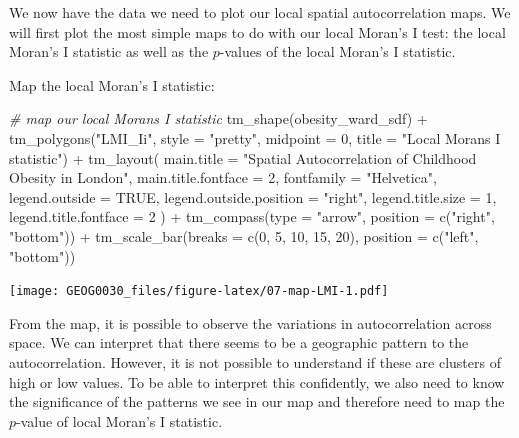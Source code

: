 \documentclass[
]{book}
\newenvironment{Shaded}{\begin{snugshade}}{\end{snugshade}}
\newcommand{\AttributeTok}[1]{\textcolor[rgb]{0.77,0.63,0.00}{#1}}
\newcommand{\CommentTok}[1]{\textcolor[rgb]{0.56,0.35,0.01}{\textit{#1}}}
\newcommand{\ConstantTok}[1]{\textcolor[rgb]{0.00,0.00,0.00}{#1}}
\newcommand{\DecValTok}[1]{\textcolor[rgb]{0.00,0.00,0.81}{#1}}
\newcommand{\FunctionTok}[1]{\textcolor[rgb]{0.00,0.00,0.00}{#1}}
\newcommand{\NormalTok}[1]{#1}
\newcommand{\SpecialCharTok}[1]{\textcolor[rgb]{0.00,0.00,0.00}{#1}}
\newcommand{\StringTok}[1]{\textcolor[rgb]{0.31,0.60,0.02}{#1}}
\begin{document}
We now have the data we need to plot our local spatial autocorrelation maps. We will first plot the most simple maps to do with our local Moran's I test: the local Moran's I statistic as well as the \(p\)-values of the local Moran's I statistic.

Map the local Moran's I statistic:

\begin{Shaded}
\begin{Highlighting}[]
\CommentTok{\# map our local Moran\textquotesingle{}s I statistic}
\FunctionTok{tm\_shape}\NormalTok{(obesity\_ward\_sdf) }\SpecialCharTok{+}
  \FunctionTok{tm\_polygons}\NormalTok{(}\StringTok{"LMI\_Ii"}\NormalTok{, }\AttributeTok{style =} \StringTok{"pretty"}\NormalTok{, }\AttributeTok{midpoint =} \DecValTok{0}\NormalTok{, }\AttributeTok{title =} \StringTok{"Local Moran\textquotesingle{}s I statistic"}\NormalTok{) }\SpecialCharTok{+}
  \FunctionTok{tm\_layout}\NormalTok{(}
    \AttributeTok{main.title =} \StringTok{"Spatial Autocorrelation of Childhood Obesity in London"}\NormalTok{,}
    \AttributeTok{main.title.fontface =} \DecValTok{2}\NormalTok{, }\AttributeTok{fontfamily =} \StringTok{"Helvetica"}\NormalTok{,}
    \AttributeTok{legend.outside =} \ConstantTok{TRUE}\NormalTok{,}
    \AttributeTok{legend.outside.position =} \StringTok{"right"}\NormalTok{,}
    \AttributeTok{legend.title.size =} \DecValTok{1}\NormalTok{,}
    \AttributeTok{legend.title.fontface =} \DecValTok{2}
\NormalTok{  ) }\SpecialCharTok{+}
  \FunctionTok{tm\_compass}\NormalTok{(}\AttributeTok{type =} \StringTok{"arrow"}\NormalTok{, }\AttributeTok{position =} \FunctionTok{c}\NormalTok{(}\StringTok{"right"}\NormalTok{, }\StringTok{"bottom"}\NormalTok{)) }\SpecialCharTok{+}
  \FunctionTok{tm\_scale\_bar}\NormalTok{(}\AttributeTok{breaks =} \FunctionTok{c}\NormalTok{(}\DecValTok{0}\NormalTok{, }\DecValTok{5}\NormalTok{, }\DecValTok{10}\NormalTok{, }\DecValTok{15}\NormalTok{, }\DecValTok{20}\NormalTok{), }\AttributeTok{position =} \FunctionTok{c}\NormalTok{(}\StringTok{"left"}\NormalTok{, }\StringTok{"bottom"}\NormalTok{))}
\end{Highlighting}
\end{Shaded}

\texttt{[image: GEOG0030\_files/figure-latex/07-map-LMI-1.pdf]}

From the map, it is possible to observe the variations in autocorrelation across space. We can interpret that there seems to be a geographic pattern to the autocorrelation. However, it is not possible to understand if these are clusters of high or low values. To be able to interpret this confidently, we also need to know the significance of the patterns we see in our map and therefore need to map the \(p\)-value of local Moran's I statistic.
\end{document}
